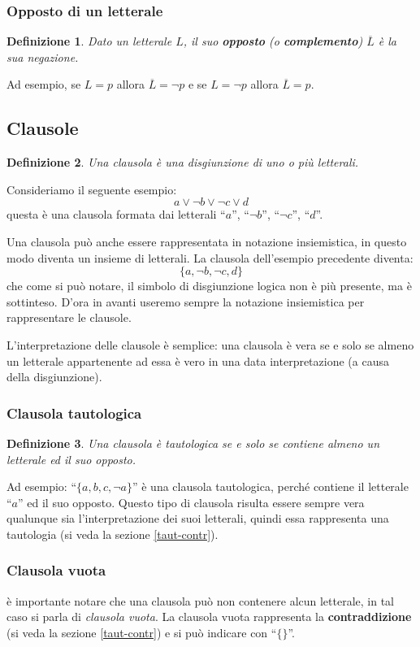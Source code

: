 \documentclass[a4paper,12pt]{report}
\newtheorem{definition}{Definizione}[section]
\begin{document}
\subsubsection{Opposto di un letterale}
\begin{definition}
    Dato un letterale $L$, il suo \textbf{opposto} (o \textbf{complemento}) $\overline{L}$ è la sua negazione.
\end{definition}
Ad esempio, se $L = p$ allora $\overline{L} = \lnot p$ e se $L = \lnot p$ allora $\overline{L} = p$.

\subsection{Clausole}
\begin{definition}
    Una clausola è una disgiunzione di uno o più letterali.
\end{definition}
Consideriamo il seguente esempio:
\[ a \lor \lnot b \lor \lnot c \lor d \] 
questa è una clausola formata dai letterali ``$a$'', ``$\lnot b$'', ``$\lnot c$'', ``$d$''.

Una clausola può anche essere rappresentata in notazione insiemistica, in questo modo diventa un insieme di letterali. La clausola dell'esempio precedente diventa:
\[ \{a, \lnot b, \lnot c, d\}\]
che come si può notare, il simbolo di disgiunzione logica non è più presente, ma è sottinteso. D'ora in avanti useremo sempre la notazione insiemistica per rappresentare le clausole.

L'interpretazione delle clausole è semplice: una clausola è vera se e solo se almeno un letterale appartenente ad essa è vero in una data interpretazione (a causa della disgiunzione).

\subsubsection{Clausola tautologica}
\begin{definition}
    Una clausola è tautologica se e solo se contiene almeno un letterale ed il suo opposto.
\end{definition}
Ad esempio: ``$\{ a, b, c, \lnot a \}$'' è una clausola tautologica, perché contiene il letterale ``$a$'' ed il suo opposto. Questo tipo di clausola risulta essere sempre vera qualunque sia l'interpretazione dei suoi letterali, quindi essa rappresenta una tautologia (si veda la sezione \ref{taut-contr}).

\subsubsection{Clausola vuota}
è importante notare che una clausola può non contenere alcun letterale, in tal caso si parla di \emph{clausola vuota}. La clausola vuota rappresenta la \textbf{contraddizione} (si veda la sezione \ref{taut-contr}) e si può indicare con ``$\{ \}$''.
\end{document}
